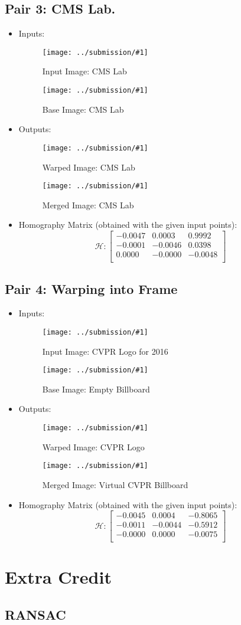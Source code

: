 \documentclass{article}
\newcommand{\listFigure}[3]{ \begin{figure}[H]
\texttt{[image: ../submission/\#1]}
		\caption{#2\label{fig:#3}}
	\end{figure}		
}
\begin{document}
\subsection{Pair 3: CMS Lab.}
\begin{itemize}
\item Inputs: 
	\listFigure{input-k-3.png}{Input Image: CMS Lab}{cmsinput-1}
	\listFigure{base-k-3.png}{Base Image: CMS Lab}{cmsinput-2}
	\item Outputs:
	\listFigure{warpIm-k-3.png}{Warped Image: CMS Lab}{cmswarp}
	\listFigure{mergeIm-k-3.png}{Merged Image: CMS Lab}{cmsmerge}
	\item Homography Matrix (obtained with the given input points):
	$$ \mathcal{H}: \begin{bmatrix}
   -0.0047 &  0.0003 &  0.9992 \\
   -0.0001 & -0.0046 &  0.0398 \\
    0.0000 & -0.0000 & -0.0048 \\
	\end{bmatrix}$$
\end{itemize}

\subsection{Pair 4: Warping into Frame}
\begin{itemize}
\item Inputs:
	\listFigure{input-frame.png}{Input Image: CVPR Logo for 2016}{frame-1}
	\listFigure{base-frame.png}{Base Image: Empty Billboard}{frame-2}
	\item Outputs:
	\listFigure{warpIm-frame.png}{Warped Image: CVPR Logo}{framewarp}
	\listFigure{mergeIm-frame.png}{Merged Image: Virtual CVPR
	Billboard}{framemerge}
	\item Homography Matrix (obtained with the given input points):
	$$ \mathcal{H}: \begin{bmatrix}
   -0.0045 &   0.0004 &  -0.8065 \\
   -0.0011 &  -0.0044 &  -0.5912 \\
   -0.0000 &   0.0000 &  -0.0075 \\
	\end{bmatrix}$$
\end{itemize}
\label{Extra Credit}
\section{Extra Credit}
\subsection{RANSAC}
\end{document}
